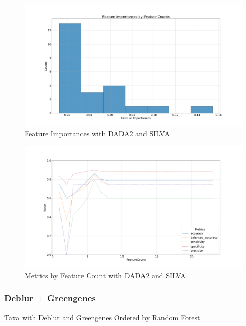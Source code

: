 \documentclass[a4paper]{article}
\begin{document}
                \begin{figure}[p]
                    \centering
                    \includegraphics[width=0.7 \linewidth]{figures/RandomForest/ANCOM.DADA2.silva/importances.png}
                    \caption{Feature Importances with DADA2 and SILVA}
                    \label{fig:importances-DADA2-silva}
                \end{figure}

                \begin{figure}[p]
                    \centering
                    \includegraphics[width=0.7 \linewidth]{figures/RandomForest/ANCOM.DADA2.silva/metrics.png}
                    \caption{Metrics by Feature Count with DADA2 and SILVA}
                    \label{fig:metrics-DADA2-silva}
                \end{figure}

            \subsubsection{Deblur + Greengenes}

                \begin{table}[p]
                    \centering
                    \caption{Taxa with Deblur and Greengenes Ordered by Random Forest}
                    \label{tb:RF-whole-deblur-gg}

                \end{table}
\end{document}
